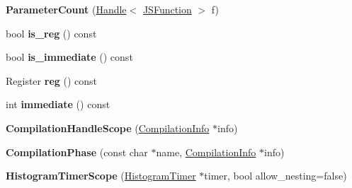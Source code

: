 \begin{DoxyCompactItemize}
\item 
\hypertarget{classv8_1_1internal_1_1_b_a_s_e___e_m_b_e_d_d_e_d_ad4dbaa506dca01ef983391681a78d824}{}{\bfseries Parameter\+Count} (\hyperlink{classv8_1_1internal_1_1_handle}{Handle}$<$ \hyperlink{classv8_1_1internal_1_1_j_s_function}{J\+S\+Function} $>$ f)\label{classv8_1_1internal_1_1_b_a_s_e___e_m_b_e_d_d_e_d_ad4dbaa506dca01ef983391681a78d824}

\item 
\hypertarget{classv8_1_1internal_1_1_b_a_s_e___e_m_b_e_d_d_e_d_afa0752341d63c9dd4fa0df809a94cac8}{}bool {\bfseries is\+\_\+reg} () const \label{classv8_1_1internal_1_1_b_a_s_e___e_m_b_e_d_d_e_d_afa0752341d63c9dd4fa0df809a94cac8}

\item 
\hypertarget{classv8_1_1internal_1_1_b_a_s_e___e_m_b_e_d_d_e_d_a38d082af20d9a1e9916b64d9d7475d0d}{}bool {\bfseries is\+\_\+immediate} () const \label{classv8_1_1internal_1_1_b_a_s_e___e_m_b_e_d_d_e_d_a38d082af20d9a1e9916b64d9d7475d0d}

\item 
\hypertarget{classv8_1_1internal_1_1_b_a_s_e___e_m_b_e_d_d_e_d_af06978bb03b2f81202d261671fa093f1}{}Register {\bfseries reg} () const \label{classv8_1_1internal_1_1_b_a_s_e___e_m_b_e_d_d_e_d_af06978bb03b2f81202d261671fa093f1}

\item 
\hypertarget{classv8_1_1internal_1_1_b_a_s_e___e_m_b_e_d_d_e_d_a2071c2cc70e162f7403743033aab5c5f}{}int {\bfseries immediate} () const \label{classv8_1_1internal_1_1_b_a_s_e___e_m_b_e_d_d_e_d_a2071c2cc70e162f7403743033aab5c5f}

\item 
\hypertarget{classv8_1_1internal_1_1_b_a_s_e___e_m_b_e_d_d_e_d_a7acf6313f55c9db6593f33899723bfa3}{}{\bfseries Compilation\+Handle\+Scope} (\hyperlink{classv8_1_1internal_1_1_compilation_info}{Compilation\+Info} $\ast$info)\label{classv8_1_1internal_1_1_b_a_s_e___e_m_b_e_d_d_e_d_a7acf6313f55c9db6593f33899723bfa3}

\item 
\hypertarget{classv8_1_1internal_1_1_b_a_s_e___e_m_b_e_d_d_e_d_aa73b168a78718fc7f1e8df436de9dc77}{}{\bfseries Compilation\+Phase} (const char $\ast$name, \hyperlink{classv8_1_1internal_1_1_compilation_info}{Compilation\+Info} $\ast$info)\label{classv8_1_1internal_1_1_b_a_s_e___e_m_b_e_d_d_e_d_aa73b168a78718fc7f1e8df436de9dc77}

\item 
\hypertarget{classv8_1_1internal_1_1_b_a_s_e___e_m_b_e_d_d_e_d_a3406eaeac2c3fc03f6ddb0e5a2f05d27}{}{\bfseries Histogram\+Timer\+Scope} (\hyperlink{classv8_1_1internal_1_1_histogram_timer}{Histogram\+Timer} $\ast$timer, bool allow\+\_\+nesting=false)\label{classv8_1_1internal_1_1_b_a_s_e___e_m_b_e_d_d_e_d_a3406eaeac2c3fc03f6ddb0e5a2f05d27}


\end{DoxyCompactItemize}
